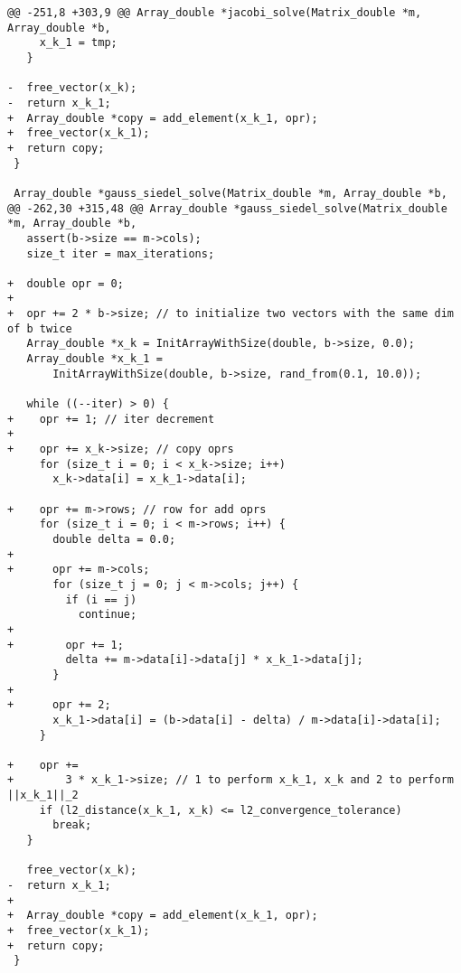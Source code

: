 \documentclass[11pt]{article}
\begin{document}
\begin{verbatim}
@@ -251,8 +303,9 @@ Array_double *jacobi_solve(Matrix_double *m, Array_double *b,
     x_k_1 = tmp;
   }

-  free_vector(x_k);
-  return x_k_1;
+  Array_double *copy = add_element(x_k_1, opr);
+  free_vector(x_k_1);
+  return copy;
 }

 Array_double *gauss_siedel_solve(Matrix_double *m, Array_double *b,
@@ -262,30 +315,48 @@ Array_double *gauss_siedel_solve(Matrix_double *m, Array_double *b,
   assert(b->size == m->cols);
   size_t iter = max_iterations;

+  double opr = 0;
+
+  opr += 2 * b->size; // to initialize two vectors with the same dim of b twice
   Array_double *x_k = InitArrayWithSize(double, b->size, 0.0);
   Array_double *x_k_1 =
       InitArrayWithSize(double, b->size, rand_from(0.1, 10.0));

   while ((--iter) > 0) {
+    opr += 1; // iter decrement
+
+    opr += x_k->size; // copy oprs
     for (size_t i = 0; i < x_k->size; i++)
       x_k->data[i] = x_k_1->data[i];

+    opr += m->rows; // row for add oprs
     for (size_t i = 0; i < m->rows; i++) {
       double delta = 0.0;
+
+      opr += m->cols;
       for (size_t j = 0; j < m->cols; j++) {
         if (i == j)
           continue;
+
+        opr += 1;
         delta += m->data[i]->data[j] * x_k_1->data[j];
       }
+
+      opr += 2;
       x_k_1->data[i] = (b->data[i] - delta) / m->data[i]->data[i];
     }

+    opr +=
+        3 * x_k_1->size; // 1 to perform x_k_1, x_k and 2 to perform ||x_k_1||_2
     if (l2_distance(x_k_1, x_k) <= l2_convergence_tolerance)
       break;
   }

   free_vector(x_k);
-  return x_k_1;
+
+  Array_double *copy = add_element(x_k_1, opr);
+  free_vector(x_k_1);
+  return copy;
 }
\end{verbatim}
\end{document}
